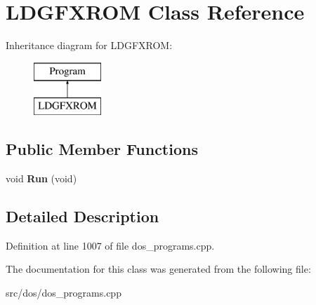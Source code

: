 \hypertarget{classLDGFXROM}{\section{L\-D\-G\-F\-X\-R\-O\-M Class Reference}
\label{classLDGFXROM}
}
Inheritance diagram for L\-D\-G\-F\-X\-R\-O\-M\-:\begin{figure}[H]
\begin{center}
\leavevmode
\includegraphics[height=2.000000cm]{classLDGFXROM}
\end{center}
\end{figure}
\subsection*{Public Member Functions}
\begin{DoxyCompactItemize}
\item 
\hypertarget{classLDGFXROM_aa4ee1bd38f082b0bb08d4fa9ed5f5626}{void {\bfseries Run} (void)}\label{classLDGFXROM_aa4ee1bd38f082b0bb08d4fa9ed5f5626}

\end{DoxyCompactItemize}


\subsection{Detailed Description}


Definition at line 1007 of file dos\-\_\-programs.\-cpp.



The documentation for this class was generated from the following file\-:\begin{DoxyCompactItemize}
\item 
src/dos/dos\-\_\-programs.\-cpp\end{DoxyCompactItemize}
